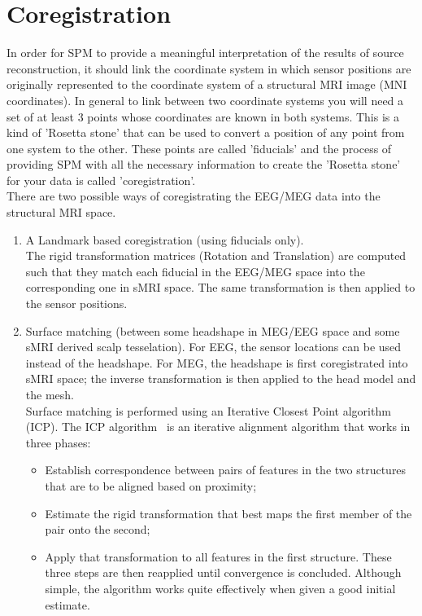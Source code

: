 \section{Coregistration}

In order for SPM to provide a meaningful
interpretation of the results of source reconstruction, it should link the coordinate
system in which sensor positions are originally represented to the coordinate system of
a structural MRI image (MNI coordinates). In general to link between two coordinate
systems you will need a set of at least 3 points whose coordinates are known in both systems.
This is a kind of 'Rosetta stone' that can be used to convert a position of any point from one system
to the other. These points are called 'fiducials' and the process of providing SPM with all the necessary
information to create the 'Rosetta stone' for your data is called 'coregistration'.  \\

There are two possible ways of coregistrating the EEG/MEG data into the structural MRI space. 

\begin{enumerate}
    \item A Landmark based coregistration (using fiducials only).\\
    The rigid transformation matrices (Rotation and Translation) are computed such that 
they match each fiducial in the EEG/MEG space into the corresponding one in sMRI space. The same 
transformation is then applied to the sensor positions.
    \item Surface matching (between some headshape in MEG/EEG space and some sMRI derived scalp tesselation).
For EEG, the sensor locations can be used instead of the headshape. For MEG, the headshape is 
first coregistrated into sMRI space; the inverse transformation is then applied to the head model
and the mesh.\\
Surface matching is performed using an Iterative Closest Point algorithm (ICP). 
The ICP algorithm~\cite{Besl_McKay} is an iterative alignment algorithm that works in three phases:
\begin{itemize}
    \item Establish correspondence between pairs of features in the two structures that 
    are to be aligned based on proximity;
    \item Estimate the rigid transformation that best maps the first member of the 
     pair onto the second;
    \item Apply that transformation to all features in the first structure. These three
     steps are then reapplied until convergence is concluded.
Although simple, the algorithm works quite effectively when given a good initial estimate.
\end{itemize}
\end{enumerate}

